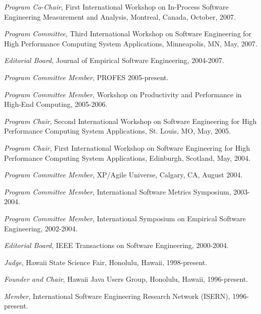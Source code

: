 \begin{Professional Activities}

\item {\em Program Co-Chair}, First International Workshop on In-Process
Software Engineering Measurement and Analysis, Montreal, Canada, October, 2007.

\item {\em Program Committee}, Third International Workshop on Software
Engineering for High Performance Computing System Applications, 
Minneapolis, MN,  May, 2007.

\item {\em Editorial Board}, Journal of Empirical Software Engineering, 2004-2007.

\item {\em Program Committee Member}, PROFES 2005-present.

\item {\em Program Committee Member}, Workshop on Productivity and
Performance in High-End Computing, 2005-2006.

\item {\em Program Chair}, Second International Workshop on Software
Engineering for High Performance Computing System Applications, St. Louis,
MO, May, 2005.

\item {\em Program Chair}, First International Workshop on Software
Engineering for High Performance Computing System Applications, Edinburgh,
Scotland, May, 2004.

\item {\em Program Committee Member}, XP/Agile Universe,  Calgary, CA, August 2004.

\item {\em Program Committee Member}, International Software Metrics Symposium, 2003-2004. 

\item {\em Program Committee Member}, International Symposium on Empirical Software Engineering, 2002-2004.

\item {\em Editorial Board}, IEEE Transactions on Software Engineering, 2000-2004.

\item {\em Judge}, 
  Hawaii State Science Fair,
  Honolulu, Hawaii, 1998-present.

\item {\em Founder and Chair}, 
  Hawaii Java Users Group,
  Honolulu, Hawaii, 1996-present.

\item {\em Member}, International Software Engineering Research Network
(ISERN), 1996-present. 

\end{Professional Activities}









